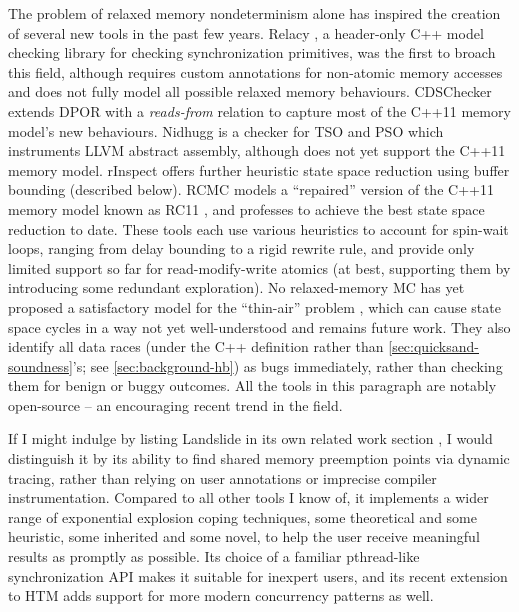 The problem of relaxed memory nondeterminism alone has inspired the creation of several new tools in the past few years.
Relacy \cite{relacy}, a header-only C++ model checking library for checking synchronization primitives,
was the first to broach this field,
although  requires custom annotations for non-atomic memory accesses
and
does not fully model all possible relaxed memory behaviours.
CDSChecker \cite{cdschecker} extends DPOR with a {\em reads-from} relation
to capture most of the C++11 memory model's new behaviours.
Nidhugg \cite{nidhugg} is a checker for TSO and PSO which instruments LLVM abstract assembly,
although does not yet support the C++11 memory model.
rInspect \cite{tsopso}
offers further heuristic state space reduction using buffer bounding (described below).
RCMC \cite{rcmc} models a ``repaired'' version of the C++11 memory model known as RC11 \cite{rc11},
and professes to achieve the best state space reduction to date.
These tools each use various heuristics to account for spin-wait loops,
ranging from delay bounding \cite{bpor} to a rigid rewrite rule,
and provide only limited support so far for read-modify-write atomics
(at best, supporting them by introducing %
some redundant exploration).
%
No relaxed-memory MC has yet proposed a satisfactory model for the ``thin-air'' problem \cite{sully-thesis},
which can cause state space cycles in a way not yet well-understood and remains future work.
They also identify all data races
(under the C++ definition rather than \cref{sec:quicksand-soundness}'s; see \cref{sec:background-hb})
as bugs immediately, rather than checking them for benign or buggy outcomes.
All the tools in this paragraph are notably open-source -- an encouraging recent trend in the field.

If I might indulge by listing Landslide in its own related work section \cite{this-thesis},
I would distinguish it by its ability to find shared memory preemption points via dynamic tracing,
rather than relying on user annotations or imprecise compiler instrumentation.
Compared to all other tools I know of,
it implements a wider range of exponential explosion coping techniques,
some theoretical and some heuristic,
some inherited and some novel,
to help the user receive meaningful results as promptly as possible.
Its choice of a familiar pthread-like synchronization API makes it suitable for inexpert users,
and its recent extension to HTM adds support for more modern concurrency patterns as well.

